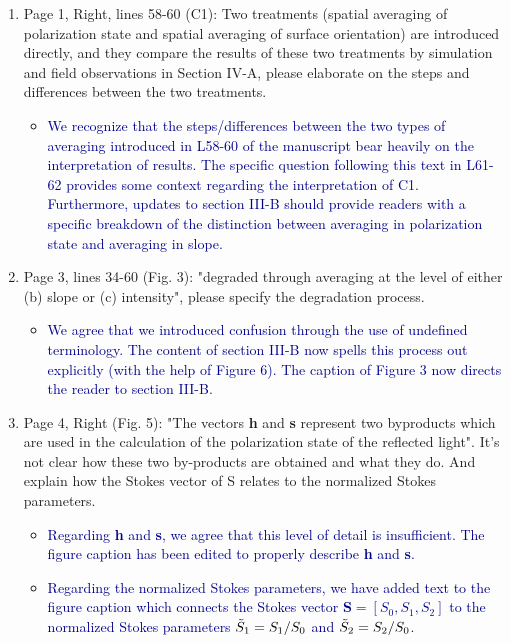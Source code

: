 \documentclass[14pt,letterpaper]{article}
\begin{document}
\begin{enumerate}
    \item Page 1, Right, lines 58-60 (C1): Two treatments (spatial averaging of polarization state and spatial averaging of surface orientation) are introduced directly, and they compare the results of these two treatments by simulation and field observations in Section IV-A, please elaborate on the steps and differences between the two treatments.
    \begin{itemize}
        \item \textcolor{darkblue}{We recognize that the steps/differences between the two types of averaging introduced in L58-60 of the manuscript bear heavily on the interpretation of results. The specific question following this text in L61-62 provides some context regarding the interpretation of C1. Furthermore, updates to section III-B should provide readers with a specific breakdown of the distinction between averaging in polarization state and averaging in slope.}
    \end{itemize}
    \item Page 3, lines 34-60 (Fig. 3): "degraded through averaging at the level of either (b) slope or (c) intensity", please specify the degradation process.
    \begin{itemize}
        \item \textcolor{darkblue}{We agree that we introduced confusion through the use of undefined terminology. The content of section III-B now spells this process out explicitly (with the help of Figure 6). The caption of Figure 3 now directs the reader to section III-B.}
    \end{itemize}
    \item Page 4, Right (Fig. 5): "The vectors \textbf{h} and \textbf{s} represent two byproducts which are used in the calculation of the polarization state of the reflected light". It's not clear how these two by-products are obtained and what they do. And explain how the Stokes vector of S relates to the normalized Stokes parameters.
    \begin{itemize}
        \item \textcolor{darkblue}{Regarding \textbf{h} and \textbf{s}, we agree that this level of detail is insufficient. The figure caption has been edited to properly describe \textbf{h} and \textbf{s}.}
        \item \textcolor{darkblue}{Regarding the normalized Stokes parameters, we have added text to the figure caption which connects the Stokes vector $\textbf{S}=[S_0,S_1,S_2]$ to the normalized Stokes parameters $\Tilde{S}_{1}=S_1/S_0$ and $\Tilde{S}_{2}=S_2/S_0$.}

\end{itemize}
\end{enumerate}
\end{document}
